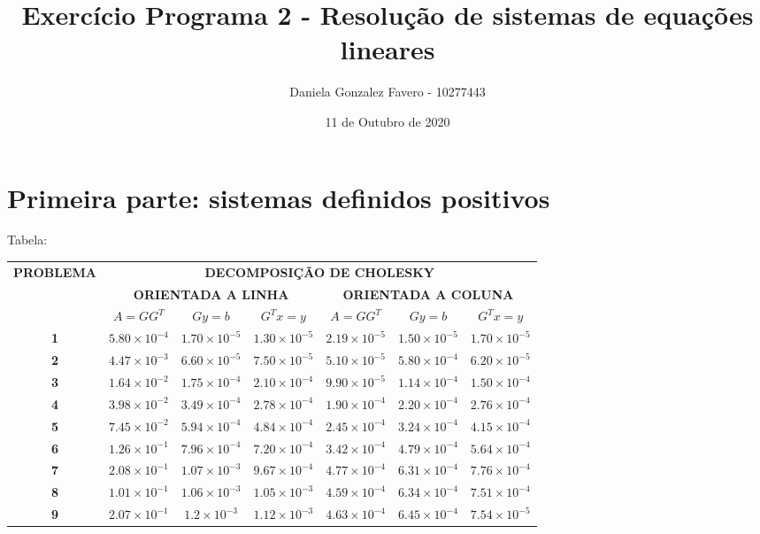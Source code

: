 \documentclass[a4paper,11pt]{article}
\title{Exercício Programa 2 - Resolução de sistemas de equações lineares}
\author{
  Daniela Gonzalez Favero - 10277443
}
\date{11 de Outubro de 2020}
\begin{document}
\maketitle


\section{Primeira parte:  sistemas definidos positivos}

Tabela:

\begin{table}[h]
\begin{tabular}{|c|c|c|c|c|c|c|}
\hline
\multirow{3}{*}{\textbf{PROBLEMA}} & \multicolumn{6}{c|}{\textbf{DECOMPOSIÇÃO DE CHOLESKY}}                                             \\ \cline{2-7} 
                                   & \multicolumn{3}{c|}{\textbf{ORIENTADA A LINHA}} & \multicolumn{3}{c|}{\textbf{ORIENTADA A COLUNA}} \\ \cline{2-7} 
                                   & \textbf{$A=GG^T$}      & \textbf{$Gy=b$}      & \textbf{$G^Tx=y$}     & \textbf{$A=GG^T$}      & \textbf{$Gy=b$}      & \textbf{$G^Tx=y$}      \\ \hline
\textbf{1}                         & $5.80\times10^{-4}$ & $1.70\times10^{-5}$ & $1.30\times10^{-5}$ & $2.19\times10^{-5}$ & $1.50\times10^{-5}$ & $1.70\times10^{-5}$  \\ \hline
\textbf{2}                         & $4.47\times10^{-3}$ & $6.60\times10^{-5}$ & $7.50\times10^{-5}$ & $5.10\times10^{-5}$ & $5.80\times10^{-4}$ & $6.20\times10^{-5}$  \\ \hline
\textbf{3}                         & $1.64\times10^{-2}$ & $1.75\times10^{-4}$ & $2.10\times10^{-4}$ & $9.90\times10^{-5}$ & $1.14\times10^{-4}$ & $1.50\times10^{-4}$  \\ \hline
\textbf{4}                         & $3.98\times10^{-2}$ & $3.49\times10^{-4}$ & $2.78\times10^{-4}$ & $1.90\times10^{-4}$ & $2.20\times10^{-4}$ & $2.76\times10^{-4}$  \\ \hline
\textbf{5}                         & $7.45\times10^{-2}$ & $5.94\times10^{-4}$ & $4.84\times10^{-4}$ & $2.45\times10^{-4}$ & $3.24\times10^{-4}$ & $4.15\times10^{-4}$  \\ \hline
\textbf{6}                         & $1.26\times10^{-1}$ & $7.96\times10^{-4}$ & $7.20\times10^{-4}$ & $3.42\times10^{-4}$ & $4.79\times10^{-4}$ & $5.64\times10^{-4}$  \\ \hline
\textbf{7}                         & $2.08\times10^{-1}$ & $1.07\times10^{-3}$ & $9.67\times10^{-4}$ & $4.77\times10^{-4}$ & $6.31\times10^{-4}$ & $7.76\times10^{-4}$  \\ \hline
\textbf{8}                         & $1.01\times10^{-1}$ & $1.06\times10^{-3}$ & $1.05\times10^{-3}$ & $4.59\times10^{-4}$ & $6.34\times10^{-4}$ & $7.51\times10^{-4}$  \\ \hline
\textbf{9}                         & $2.07\times10^{-1}$ & $1.2\times10^{-3}$ & $1.12\times10^{-3}$ & $4.63\times10^{-4}$ & $6.45\times10^{-4}$ & $7.54\times10^{-5}$  \\ \hline
\end{tabular}
\end{table}
\end{document}
